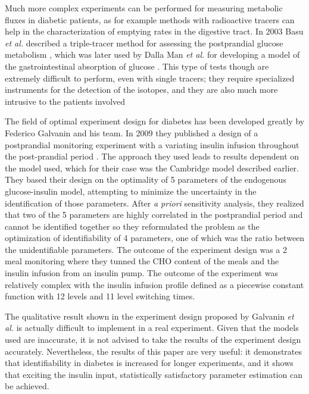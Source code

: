 Much more complex experiments can be performed for measuring metabolic fluxes in diabetic patients, as for example methods with radioactive tracers can help in the characterization of emptying rates in the digestive tract. In 2003 Basu \textit{et al.} described a triple-tracer method for assessing the postprandial glucose metabolism \cite{basu2003use}, which was later used by Dalla Man \textit{et al.} for developing a model of the gastrointestinal absorption of glucose \cite{man2007meal}. This type of tests though are extremely difficult to perform, even with single tracers; they require specialized instruments for the detection of the isotopes, and they are also much more intrusive to the patients involved

The field of optimal experiment design for diabetes has been developed greatly by Federico Galvanin and his team. In 2009 they published a design of a postprandial monitoring experiment with a variating insulin infusion throughout the post-prandial period \cite{galvanin2009}. The approach they used leads to results dependent on the model used, which for their case was the Cambridge model described earlier. They based their design on the optimality of 5 parameters of the endogenous glucose-insulin model, attempting to minimize the uncertainty in the identification of those parameters. After \textit{a priori} sensitivity analysis, they realized that two of the 5 parameters are highly correlated in the postprandial period and cannot be identified together so they reformulated the problem as the optimization of identifiability of 4 parameters, one of which was the ratio between the unidentifiable parameters. The outcome of the experiment design was a 2 meal monitoring where they tunned the CHO content of the meals and the insulin infusion from an insulin pump. The outcome of the experiment was relatively complex with the insulin infusion profile defined as a piecewise constant function with 12 levels and 11 level switching times.

The qualitative result shown in the experiment design proposed by Galvanin \textit{et al.} is actually difficult to implement in a real experiment. Given that the models used are inaccurate, it is not advised to take the results of the experiment design accurately. Nevertheless, the results of this paper are very useful: it demonstrates that identifiability in diabetes is increased for longer experiments, and it shows that exciting the insulin input, statistically satisfactory parameter estimation can be achieved.

